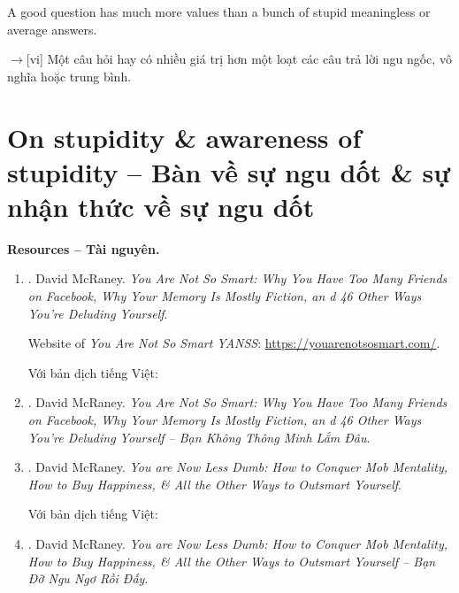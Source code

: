 \documentclass[12pt,oneside]{book}
\begin{document}
A good question has much more values than a bunch of stupid meaningless or average answers.

{\sf[en]$\to$[vi]} Một câu hỏi hay có nhiều giá trị hơn một loạt các câu trả lời ngu ngốc, vô nghĩa hoặc trung bình.

\section{On stupidity \& awareness of stupidity -- Bàn về sự ngu dốt \& sự nhận thức về sự ngu dốt}
{\bf \textsf{Resources -- Tài nguyên.}}
\begin{enumerate}
	\item \cite{McRaney_not_smart}. {\sc David McRaney}. {\it You Are Not So Smart: Why You Have Too Many Friends on Facebook, Why Your Memory Is Mostly Fiction, an d 46 Other Ways You're Deluding Yourself}.
	
	Website of {\it You Are Not So Smart YANSS}: \url{https://youarenotsosmart.com/}.
	
	Với bản dịch tiếng Việt:
	\item \cite{McRaney_not_smart_VN}. {\sc David McRaney}. {\it You Are Not So Smart: Why You Have Too Many Friends on Facebook, Why Your Memory Is Mostly Fiction, an d 46 Other Ways You're Deluding Yourself -- Bạn Không Thông Minh Lắm Đâu}.
	\item \cite{McRaney_less_stupid}. {\sc David McRaney}. {\it You are Now Less Dumb: How to Conquer Mob Mentality, How to Buy Happiness, \& All the Other Ways to Outsmart Yourself}.
	
	Với bản dịch tiếng Việt:
	\item \cite{McRaney_not_smart_VN}. {\sc David McRaney}. {\it You are Now Less Dumb: How to Conquer Mob Mentality, How to Buy Happiness, \& All the Other Ways to Outsmart Yourself -- Bạn Đỡ Ngu Ngơ Rồi Đấy}.
\end{enumerate}
\end{document}
